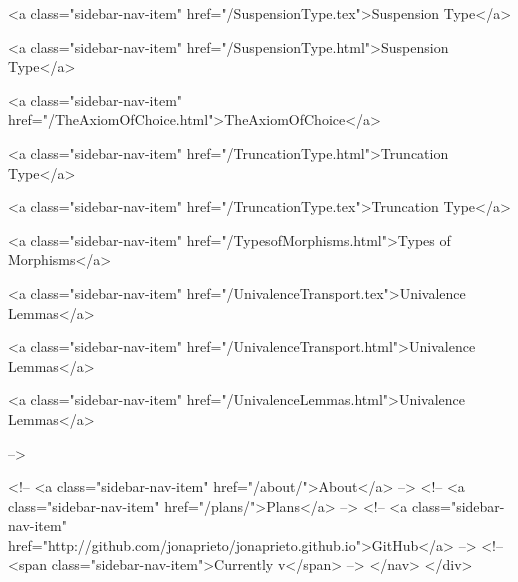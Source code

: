       
    
      
        
          <a class="sidebar-nav-item" href="/SuspensionType.tex">Suspension Type</a>
        
      
    
      
        
          <a class="sidebar-nav-item" href="/SuspensionType.html">Suspension Type</a>
        
      
    
      
        
          <a class="sidebar-nav-item" href="/TheAxiomOfChoice.html">TheAxiomOfChoice</a>
        
      
    
      
        
          <a class="sidebar-nav-item" href="/TruncationType.html">Truncation Type</a>
        
      
    
      
        
          <a class="sidebar-nav-item" href="/TruncationType.tex">Truncation Type</a>
        
      
    
      
        
          <a class="sidebar-nav-item" href="/TypesofMorphisms.html">Types of Morphisms</a>
        
      
    
      
        
          <a class="sidebar-nav-item" href="/UnivalenceTransport.tex">Univalence Lemmas</a>
        
      
    
      
        
          <a class="sidebar-nav-item" href="/UnivalenceTransport.html">Univalence Lemmas</a>
        
      
    
      
        
          <a class="sidebar-nav-item" href="/UnivalenceLemmas.html">Univalence Lemmas</a>
        
      
     -->

    <!-- <a class="sidebar-nav-item" href="/about/">About</a> -->
    <!-- <a class="sidebar-nav-item" href="/plans/">Plans</a> -->
    <!-- <a class="sidebar-nav-item" href="http://github.com/jonaprieto/jonaprieto.github.io">GitHub</a> -->
    <!-- <span class="sidebar-nav-item">Currently v</span> -->
  </nav>
</div>

